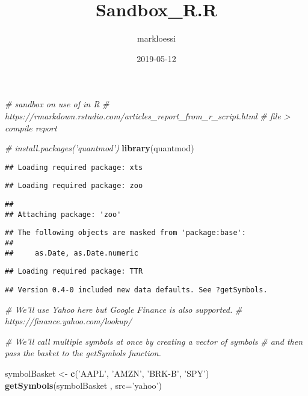 \documentclass[]{article}
\title{Sandbox\_R.R}
\author{markloessi}
\date{2019-05-12}
\newenvironment{Shaded}{\begin{snugshade}}{\end{snugshade}}
\newcommand{\KeywordTok}[1]{\textcolor[rgb]{0.13,0.29,0.53}{\textbf{#1}}}
\newcommand{\DataTypeTok}[1]{\textcolor[rgb]{0.13,0.29,0.53}{#1}}
\newcommand{\StringTok}[1]{\textcolor[rgb]{0.31,0.60,0.02}{#1}}
\newcommand{\CommentTok}[1]{\textcolor[rgb]{0.56,0.35,0.01}{\textit{#1}}}
\newcommand{\NormalTok}[1]{#1}
\begin{document}
\maketitle

\begin{Shaded}
\begin{Highlighting}[]
\CommentTok{# sandbox on use of in R}
\CommentTok{# https://rmarkdown.rstudio.com/articles_report_from_r_script.html}
\CommentTok{# file > compile report}

\CommentTok{# install.packages('quantmod')}
\KeywordTok{library}\NormalTok{(quantmod)}
\end{Highlighting}
\end{Shaded}

\begin{verbatim}
## Loading required package: xts
\end{verbatim}

\begin{verbatim}
## Loading required package: zoo
\end{verbatim}

\begin{verbatim}
## 
## Attaching package: 'zoo'
\end{verbatim}

\begin{verbatim}
## The following objects are masked from 'package:base':
## 
##     as.Date, as.Date.numeric
\end{verbatim}

\begin{verbatim}
## Loading required package: TTR
\end{verbatim}

\begin{verbatim}
## Version 0.4-0 included new data defaults. See ?getSymbols.
\end{verbatim}

\begin{Shaded}
\begin{Highlighting}[]
\CommentTok{# We'll use Yahoo here but Google Finance is also supported. }
\CommentTok{# https://finance.yahoo.com/lookup/}

\CommentTok{# We'll call multiple symbols at once by creating a vector of symbols}
\CommentTok{# and then pass the basket to the getSymbols function.}

\NormalTok{symbolBasket <-}\StringTok{ }\KeywordTok{c}\NormalTok{(}\StringTok{'AAPL'}\NormalTok{, }\StringTok{'AMZN'}\NormalTok{, }\StringTok{'BRK-B'}\NormalTok{, }\StringTok{'SPY'}\NormalTok{)}
\KeywordTok{getSymbols}\NormalTok{(symbolBasket , }\DataTypeTok{src=}\StringTok{'yahoo'}\NormalTok{)}
\end{Highlighting}
\end{Shaded}
\end{document}

